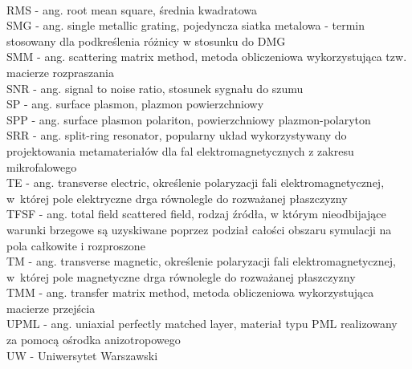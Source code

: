 \\RMS - ang. root mean square, średnia kwadratowa
\\SMG - ang. single metallic grating, pojedyncza siatka metalowa - termin stosowany dla podkreślenia różnicy w stosunku do DMG
\\SMM - ang. scattering matrix method, metoda obliczeniowa wykorzystująca tzw. macierze rozpraszania
\\SNR - ang. signal to noise ratio, stosunek sygnału do szumu
\\SP - ang. surface plasmon, plazmon powierzchniowy
\\SPP - ang. surface plasmon polariton, powierzchniowy plazmon-polaryton
\\SRR - ang. split-ring resonator, popularny układ wykorzystywany do projektowania metamateriałów dla fal elektromagnetycznych z zakresu mikrofalowego
\\TE - ang. transverse electric, określenie polaryzacji fali elektromagnetycznej, w~której pole elektryczne drga równolegle do rozważanej płaszczyzny
\\TFSF - ang. total field scattered field, rodzaj źródła, w którym nieodbijające warunki brzegowe są uzyskiwane poprzez podział całości obszaru symulacji na pola całkowite i rozproszone
\\TM - ang. transverse magnetic, określenie polaryzacji fali elektromagnetycznej, w~której pole magnetyczne drga równolegle do rozważanej płaszczyzny
\\TMM - ang. transfer matrix method, metoda obliczeniowa wykorzystująca macierze przejścia
\\UPML - ang.  uniaxial perfectly matched layer, materiał typu PML realizowany za pomocą ośrodka anizotropowego
\\UW - Uniwersytet Warszawski
